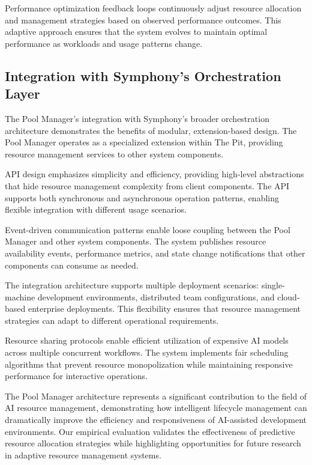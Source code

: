 Performance optimization feedback loops continuously adjust resource allocation and management strategies based on observed performance outcomes. This adaptive approach ensures that the system evolves to maintain optimal performance as workloads and usage patterns change.

\subsection*{Integration with Symphony's Orchestration Layer}

The Pool Manager's integration with Symphony's broader orchestration architecture demonstrates the benefits of modular, extension-based design. The Pool Manager operates as a specialized extension within The Pit, providing resource management services to other system components.

API design emphasizes simplicity and efficiency, providing high-level abstractions that hide resource management complexity from client components. The API supports both synchronous and asynchronous operation patterns, enabling flexible integration with different usage scenarios.

Event-driven communication patterns enable loose coupling between the Pool Manager and other system components. The system publishes resource availability events, performance metrics, and state change notifications that other components can consume as needed.

The integration architecture supports multiple deployment scenarios: single-machine development environments, distributed team configurations, and cloud-based enterprise deployments. This flexibility ensures that resource management strategies can adapt to different operational requirements.

Resource sharing protocols enable efficient utilization of expensive AI models across multiple concurrent workflows. The system implements fair scheduling algorithms that prevent resource monopolization while maintaining responsive performance for interactive operations.

The Pool Manager architecture represents a significant contribution to the field of AI resource management, demonstrating how intelligent lifecycle management can dramatically improve the efficiency and responsiveness of AI-assisted development environments. Our empirical evaluation validates the effectiveness of predictive resource allocation strategies while highlighting opportunities for future research in adaptive resource management systems.
